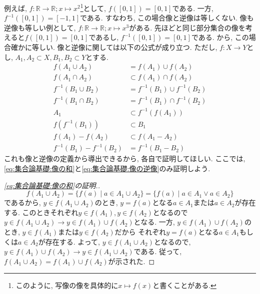 \documentclass[a4j,dvipdfmx]{jsarticle}
\numberwithin{equation}{section}
\begin{document}
            例えば, $f:\mathbb{R}\rightarrow \mathbb{R};x\mapsto x^2$\footnote{このように, 写像の像を具体的に$x\mapsto f(x)$と書くことがある.}として, $f([0,1])=[0,1]$である. 一方, $f^{-1}([0,1])=[-1,1]$である. 
            すなわち, この場合像と逆像は等しくない. 像も逆像も等しい例として, $f:\mathbb{R}\rightarrow \mathbb{R};x\mapsto x^3$がある. 先ほどと同じ部分集合の像を考えると$f([0,1])=[0,1]$であるし, $f^{-1}([0,1])=[0,1]$である.
            から, この場合確かに等しい.
            \clearpage
            像と逆像に関しては以下の公式が成り立つ. ただし, $f:X\rightarrow Y$とし, $A_1,A_2\subset X,B_1,B_2\subset Y$とする.
            \begin{align}
                f(A_1 \cup A_2)&=f(A_1)\cup f(A_2) \label{eq:集合論基礎:像の和}\\
                f(A_1 \cap A_2)&\subset f(A_1)\cap f(A_2) \label{eq:集合論基礎:像の積}\\
                f^{-1}(B_1 \cup B_2)&=f^{-1}(B_1)\cup f^{-1}(B_2) \label{eq:集合論基礎:逆像の和}\\    
                f^{-1}(B_1 \cap B_2)&=f^{-1}(B_1)\cap f^{-1}(B_2) \label{eq:集合論基礎:逆像の積}\\    
                A_1 &\subset f^{-1}(f(A_1)) \label{eq:集合論基礎:像の逆像}\\
                f(f^{-1}(B_1)) &\subset B_1 \label{eq:集合論基礎:逆像の像}\\
                f(A_1)-f(A_2) &\subset f(A_1-A_2) \label{eq:集合論基礎:像の差}\\
                f^{-1}(B_1)-f^{-1}(B_2) &= f^{-1}(B_1-B_2) \label{eq:集合論基礎:逆像の差}
            \end{align}
            これも像と逆像の定義から導出できるから, 各自で証明してほしい. ここでは, \eqref{eq:集合論基礎:像の和}と\eqref{eq:集合論基礎:像の逆像}のみ証明しよう.
            \begin{proof}[\eqref{eq:集合論基礎:像の和}の証明.]
                \begin{equation*}
                    f(A_1\cup A_2)=\{f(a)\mid a\in A_1\cup A_2\}=\{f(a)\mid a\in A_1\lor a\in A_2\}
                \end{equation*}
                であるから, $y\in f(A_1\cup A_2)$のとき, $y=f(a)$となる$a\in A_1$または$a\in A_2$が存在する. このときそれぞれ$y\in f(A_1),y\in f(A_2)$となるので
                $y\in f(A_1\cup A_2)\rightarrow y\in f(A_1)\cup f(A_2)$となる. 一方, $y\in f(A_1)\cup f(A_2)$のとき, $y\in f(A_1)$または$y\in f(A_2)$だから
                それぞれ$y=f(a)$となる$a\in A_1$もしくは$a\in A_2$が存在する. よって, $y\in f(A_1\cup A_2)$となるので, $y\in f(A_1)\cup f(A_2)\rightarrow y\in f(A_1\cup A_2)$である.
                従って, $f(A_1\cup A_2)=f(A_1)\cup f(A_2)$が示された.
            \end{proof}
\end{document}
